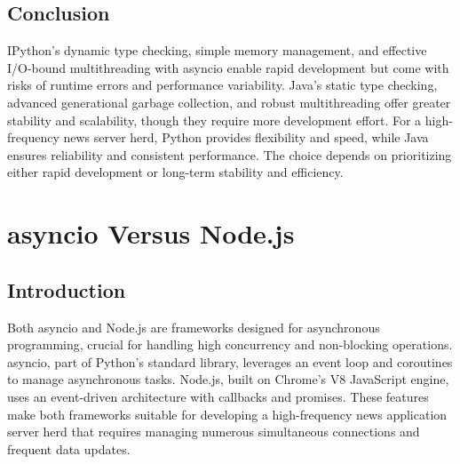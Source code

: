 \documentclass[letterpaper,twocolumn,10pt]{article}
\begin{document}
\subsection{Conclusion}
\noindent{}IPython’s dynamic type checking, simple memory management, and effective I/O-bound multithreading with asyncio enable rapid development but come with risks of runtime errors and performance variability. Java’s static type checking, advanced generational garbage collection, and robust multithreading offer greater stability and scalability, though they require more development effort. For a high-frequency news server herd, Python provides flexibility and speed, while Java ensures reliability and consistent performance. The choice depends on prioritizing either rapid development or long-term stability and efficiency.

\section{asyncio Versus Node.js}
\subsection{Introduction}
Both asyncio and Node.js are frameworks designed for asynchronous programming, crucial for handling high concurrency and non-blocking operations. asyncio, part of Python’s standard library, leverages an event loop and coroutines to manage asynchronous tasks. Node.js, built on Chrome's V8 JavaScript engine, uses an event-driven architecture with callbacks and promises. These features make both frameworks suitable for developing a high-frequency news application server herd that requires managing numerous simultaneous connections and frequent data updates.

\end{document}
